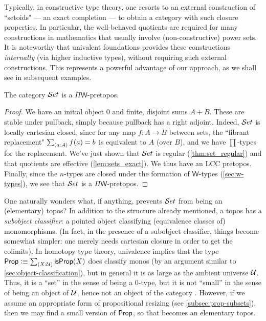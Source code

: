 Typically, in constructive type theory, one resorts to an external construction of ``setoids" --- an exact completion --- to obtain a category with such closure properties.  In particular, the well-behaved quotients are required for many constructions in mathematics that usually involve (non-constructive) power sets.  It is noteworthy that univalent foundations provides these constructions \emph{internally} (via higher inductive types), without requiring such external constructions.  This represents a powerful advantage of our approach, as we shall see in subsequent examples.

\begin{thm} The category $\mathcal{S}et$ is a $\Pi\mathsf{W}$-pretopos.
\end{thm}
\begin{proof}
We have an initial object $0$ and finite, disjoint sums $A+B$.  These are stable under pullback, simply because pullback has a right adjoint.  Indeed, $\mathcal{S}et$ is locally cartesian closed, since for any map $f:A\to B$ between sets, the ``fibrant replacement" $\sm{a:A}f(a)=b$ is equivalent to $A$ (over $B$), and we have $\prod$-types for the replacement.
We've just shown that $\mathcal{S}et$ is regular (\autoref{thm:set_regular}) and that quotients are effective (\autoref{lem:sets_exact}). We thus have an LCC pretopos. Finally, since the $n$-types are closed under the formation of $\mathsf{W}$-types
(\autoref{sec:w-types}), we see that $\mathcal{S}et$ is a $\Pi\mathsf{W}$-pretopos. 
\end{proof}

One naturally wonders what, if anything, prevents $\mathcal{S}et$ from being an (elementary) topos?
In addition to the structure already mentioned, a topos has a
\emph{subobject classifier}: a pointed object classifying (equivalence classes of) monomorphisms.  (In fact, in the presence of a subobject
classifier, things become somewhat simpler: one merely needs cartesian closure in order to get the colimits).
In homotopy type theory, univalence implies that the type $\prop \defeq \sm{X:\UU}\isprop(X)$ does classify monos (by an argument similar to \autoref{sec:object-classification}), but in general it is as large as the ambient universe $\mathcal{U}$.
Thus, it is a ``set'' in the sense of being a $0$-type, but it is not ``small'' in the sense of being an object of $\mathcal{U}$, hence not an object of the category \uset.
However, if we assume an appropriate form of propositional resizing (see \autoref{subsec:prop-subsets}), then we may find a small version of $\mathsf{Prop}$, so that \uset becomes an elementary topos.

